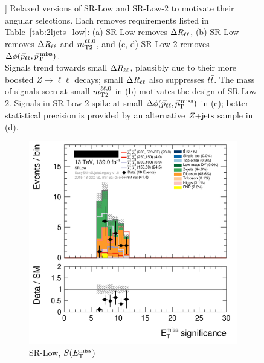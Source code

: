 \begin{figure}[tp]
]{%
Relaxed versions of SR-Low and SR-Low-2 to motivate their angular selections.
Each removes requirements listed in Table~\ref{tab:2ljets_low}:
(a) SR-Low removes $\Delta R_{\ell\ell}$,
(b) SR-Low removes $\Delta R_{\ell\ell}$ and $m_\mathrm{T2}^{\ell\ell,0}$,
and
(c, d) SR-Low-2 removes $\Delta\phi(\vec p_{\ell\ell}, \vec p_\mathrm{T}^\mathrm{\:miss})$.
\\[0.5em]
Signals trend towards small $\Delta R_{\ell\ell}$, plausibly due to their more boosted
$Z\to \ell\ell$ decays; small $\Delta R_{\ell\ell}$ also suppresses $t\bar t$.
The mass of signals seen at small $m_\mathrm{T2}^{\ell\ell,0}$ in (b) motivates the design of
SR-Low-2.
Signals in SR-Low-2 spike at small $\Delta\phi(\vec p_{\ell\ell}, \vec p_\mathrm{T}^\mathrm{\:miss})$ in (c); better statistical
precision is provided by an alternative $Z\mathrm{+jets}$ sample in (d).
}
\label{fig:2ljets_low_minus}
\end{figure}

\begin{figure}[tp]
\centering
\begin{subfigure}{0.495\textwidth}
\centering
\includegraphics[width=\textwidth]{figures/2ljets_def_met_Sign_SRLow.png}
\caption{SR-Low, $S(E_\mathrm{T}^\mathrm{miss})$}
\end{subfigure}
\hfill
\begin{subfigure}{0.495\textwidth}
\centering

\end{subfigure}
\end{figure}

